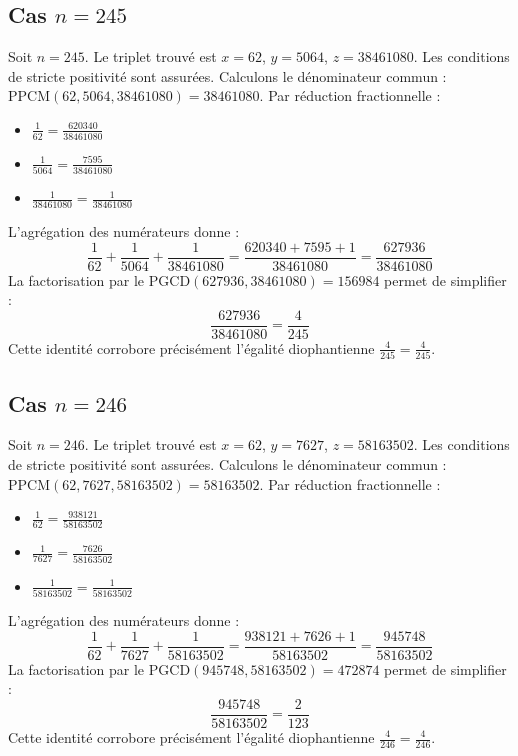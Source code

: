 \documentclass[11pt,a4paper]{article}
\begin{document}
\subsection{Cas $n = 245$}
Soit $n = 245$. Le triplet trouvé est $x = 62$, $y = 5064$, $z = 38461080$.
Les conditions de stricte positivité sont assurées.
Calculons le dénominateur commun : $\text{PPCM}(62, 5064, 38461080) = 38461080$.
Par réduction fractionnelle :
\begin{itemize}
    \item $\frac{1}{62} = \frac{620340}{38461080}$
    \item $\frac{1}{5064} = \frac{7595}{38461080}$
    \item $\frac{1}{38461080} = \frac{1}{38461080}$
\end{itemize}
L'agrégation des numérateurs donne :
$$ \frac{1}{62} + \frac{1}{5064} + \frac{1}{38461080} = \frac{620340 + 7595 + 1}{38461080} = \frac{627936}{38461080} $$
La factorisation par le $\text{PGCD}(627936, 38461080) = 156984$ permet de simplifier :
$$ \frac{627936}{38461080} = \frac{4}{245} $$
Cette identité corrobore précisément l'égalité diophantienne $\frac{4}{245} = \frac{4}{245}$.

\subsection{Cas $n = 246$}
Soit $n = 246$. Le triplet trouvé est $x = 62$, $y = 7627$, $z = 58163502$.
Les conditions de stricte positivité sont assurées.
Calculons le dénominateur commun : $\text{PPCM}(62, 7627, 58163502) = 58163502$.
Par réduction fractionnelle :
\begin{itemize}
    \item $\frac{1}{62} = \frac{938121}{58163502}$
    \item $\frac{1}{7627} = \frac{7626}{58163502}$
    \item $\frac{1}{58163502} = \frac{1}{58163502}$
\end{itemize}
L'agrégation des numérateurs donne :
$$ \frac{1}{62} + \frac{1}{7627} + \frac{1}{58163502} = \frac{938121 + 7626 + 1}{58163502} = \frac{945748}{58163502} $$
La factorisation par le $\text{PGCD}(945748, 58163502) = 472874$ permet de simplifier :
$$ \frac{945748}{58163502} = \frac{2}{123} $$
Cette identité corrobore précisément l'égalité diophantienne $\frac{4}{246} = \frac{4}{246}$.
\end{document}
